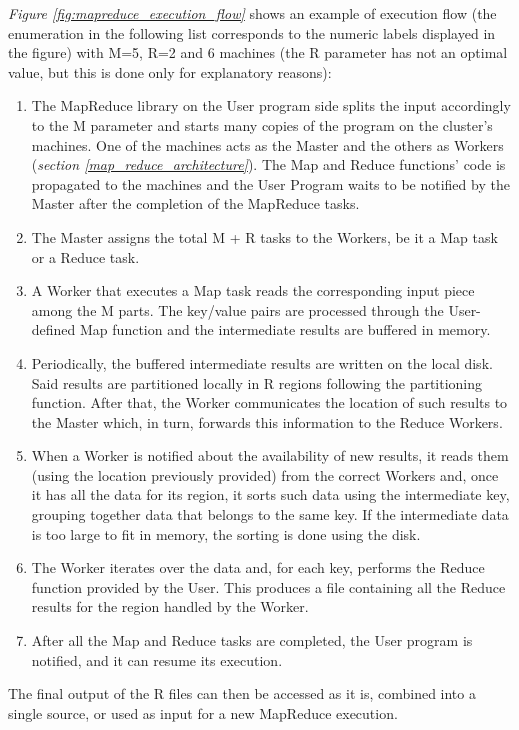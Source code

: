 \textit{Figure \ref{fig:mapreduce_execution_flow}} shows an example of execution flow (the enumeration in the following list corresponds to the numeric labels displayed in the figure) with M=5, R=2 and 6 machines (the R parameter has not an optimal value, but this is done only for explanatory reasons):
\begin{enumerate}
    \item The MapReduce library on the User program side splits the input accordingly to the M parameter and starts many copies of the program on the cluster's machines. One of the machines acts as the Master and the others as Workers (\textit{section \ref{map_reduce_architecture}}). The Map and Reduce functions' code is propagated to the machines and the User Program waits to be notified by the Master after the completion of the MapReduce tasks.
    \item The Master assigns the total M + R tasks to the Workers, be it a Map task or a Reduce task.
    \item A Worker that executes a Map task reads the corresponding input piece among the M parts. The key/value pairs are processed through the User-defined Map function and the intermediate results are buffered in memory.
    \item Periodically, the buffered intermediate results are written on the local disk. Said results are partitioned locally in R regions following the partitioning function. After that, the Worker communicates the location of such results to the Master which, in turn, forwards this information to the Reduce Workers.
    \item When a Worker is notified about the availability of new results, it reads them (using the location previously provided) from the correct Workers and, once it has all the data for its region, it sorts such data using the intermediate key, grouping together data that belongs to the same key. If the intermediate data is too large to fit in memory, the sorting is done using the disk.
    \item The Worker iterates over the data and, for each key, performs the Reduce function provided by the User. This produces a file containing all the Reduce results for the region handled by the Worker.
    \item After all the Map and Reduce tasks are completed, the User program is notified, and it can resume its execution.
\end{enumerate}

The final output of the R files can then be accessed as it is, combined into a single source, or used as input for a new MapReduce execution.
